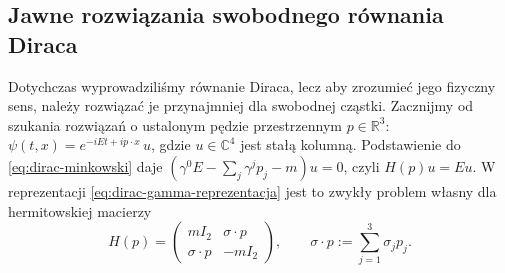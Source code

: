 \subsection{Jawne rozwiązania swobodnego równania Diraca}
\label{subsec:dirac-rozwiazania}

Dotychczas wyprowadziliśmy równanie Diraca, lecz aby zrozumieć
jego fizyczny sens, należy rozwiązać je przynajmniej dla
swobodnej cząstki. Zacznijmy od szukania rozwiązań o ustalonym
pędzie przestrzennym $p\in\mathbb R^3$:
$\psi(t,x)=e^{-iEt+ip\cdot x}\,u$, gdzie $u\in\mathbb C^4$
jest stałą kolumną. Podstawienie do
\eqref{eq:dirac-minkowski} daje
$(\gamma^0E-\sum_j\gamma^jp_j-m)u=0$, czyli
$H(p)u=Eu$. W reprezentacji
\eqref{eq:dirac-gamma-reprezentacja} jest to zwykły problem
własny dla hermitowskiej macierzy
\begin{equation}\label{eq:dirac-hamiltonian-ped}
 H(p)=\begin{pmatrix}
 mI_2&\sigma\cdot p\\
 \sigma\cdot p&-mI_2
 \end{pmatrix},\qquad
 \sigma\cdot p:=\sum_{j=1}^3\sigma_jp_j.
\end{equation}

